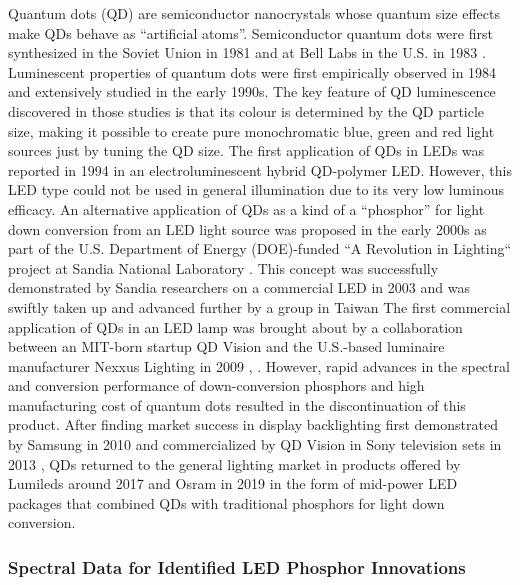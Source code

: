 \documentclass[parskip=full]{article}
\begin{document}
Quantum dots (QD) are semiconductor nanocrystals whose quantum size effects make QDs behave as “artificial atoms”. Semiconductor quantum dots were first synthesized in the Soviet Union in 1981 \cite{ekimov1981quantum} and at Bell Labs in the U.S. in 1983 \cite{Rossetti1983}. Luminescent properties of quantum dots were first empirically observed in 1984 \cite{fojtik1984photo} and extensively studied in the early 1990s. The key feature of QD luminescence discovered in those studies is that its colour is determined by the QD particle size, making it possible to create pure monochromatic blue, green and red light sources just by tuning the QD size. The first application of QDs in LEDs was reported in 1994 in an electroluminescent hybrid QD-polymer LED. However, this LED type could not be used in general illumination due to its very low luminous efficacy. An alternative application of QDs as a kind of a “phosphor” for light down conversion from an LED light source was proposed in the early 2000s as part of the U.S. Department of Energy (DOE)-funded “A Revolution in Lighting“ project at Sandia National Laboratory \cite{simmonsfinal}. This concept was successfully demonstrated by Sandia researchers on a commercial LED in 2003 \cite{shea_rohwer_development_2004}\cite{noauthor_sandia_nodate} and was swiftly taken up and advanced further by a group in Taiwan \cite{Chen_2005}\cite{Hsueh_Shih_Chen_2006} The first commercial application of QDs in an LED lamp was brought about by a collaboration between an MIT-born startup QD Vision and the U.S.-based luminaire manufacturer Nexxus Lighting in 2009 \cite{ledprof_nexxusqd}, \cite{bourzac2013quantum}. However, rapid advances in the spectral and conversion performance of down-conversion phosphors and high manufacturing cost of quantum dots resulted in the discontinuation of this product. After finding market success in display backlighting first demonstrated by Samsung in 2010 \cite{Jang2010} and commercialized by QD Vision in Sony television sets in 2013 \cite{bourzac2013quantum}, QDs returned to the general lighting market in products offered by Lumileds \cite{noauthor_global_2017}\cite{noauthor_quantum_2020} around 2017 and Osram in 2019 \cite{osramqdots} in the form of mid-power LED packages that combined QDs with traditional phosphors for light down conversion.

\clearpage
\subsubsection{Spectral Data for Identified LED Phosphor Innovations}
\end{document}
